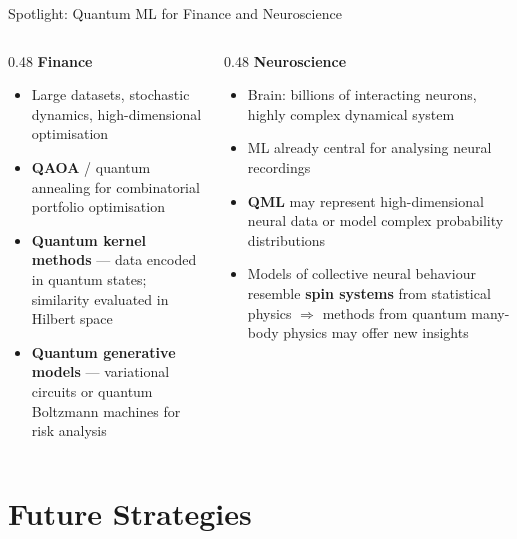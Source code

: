 \documentclass[aspectratio=169]{beamer}
\begin{document}
\begin{frame}{Spotlight: Quantum ML for Finance and Neuroscience}

  \begin{columns}[T]
    \begin{column}{0.48\textwidth}
      \textbf{Finance}
      \begin{itemize}
        \item Large datasets, stochastic dynamics,
              high-dimensional optimisation
        \item \textbf{QAOA} / quantum annealing for combinatorial
              portfolio optimisation
        \item \textbf{Quantum kernel methods} — data encoded in
              quantum states; similarity evaluated in Hilbert space
        \item \textbf{Quantum generative models} — variational circuits
              or quantum Boltzmann machines for risk analysis
      \end{itemize}
    \end{column}
    \begin{column}{0.48\textwidth}
      \textbf{Neuroscience}
      \begin{itemize}
        \item Brain: billions of interacting neurons, highly complex
              dynamical system
        \item ML already central for analysing neural recordings
        \item \textbf{QML} may represent high-dimensional neural data
              or model complex probability distributions
        \item Models of collective neural behaviour resemble
              \textbf{spin systems} from statistical physics
              $\Rightarrow$ methods from quantum many-body physics
              may offer new insights
      \end{itemize}
    \end{column}
  \end{columns}

\end{frame}

\section{Future Strategies}
\end{document}
